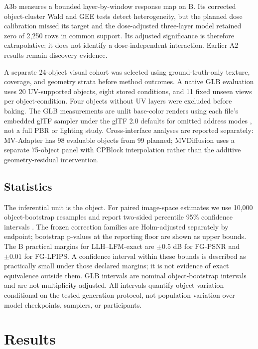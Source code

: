 \documentclass[times,twocolumn,final]{elsarticle}
\begin{document}
A3b measures a bounded layer-by-window response map on B. Its corrected object-cluster Wald and GEE tests detect heterogeneity, but the planned dose calibration missed its target and the dose-adjusted three-layer model retained zero of 2,250 rows in common support. Its adjusted significance is therefore extrapolative; it does not identify a dose-independent interaction. Earlier A2 results remain discovery evidence.

A separate 24-object visual cohort was selected using ground-truth-only texture, coverage, and geometry strata before method outcomes. A native GLB evaluation uses 20 UV-supported objects, eight stored conditions, and 11 fixed unseen views per object-condition. Four objects without UV layers were excluded before baking. The GLB measurements are unlit base-color renders using each file's embedded glTF sampler under the glTF 2.0 defaults for omitted address modes \cite{gltf2020}, not a full PBR or lighting study. Cross-interface analyses are reported separately: MV-Adapter has 98 evaluable objects from 99 planned; MVDiffusion uses a separate 75-object panel with CPBlock interpolation rather than the additive geometry-residual intervention.

\subsection{Statistics}

The inferential unit is the object. For paired image-space estimates we use 10,000 object-bootstrap resamples and report two-sided percentile 95\% confidence intervals \cite{efron1993bootstrap}. The frozen correction families are Holm-adjusted separately by endpoint; bootstrap p-values at the reporting floor are shown as upper bounds. The B practical margins for LLH--LFM-exact are $\pm0.5$ dB for FG-PSNR and $\pm0.01$ for FG-LPIPS. A confidence interval within these bounds is described as practically small under those declared margins; it is not evidence of exact equivalence outside them. GLB intervals are nominal object-bootstrap intervals and are not multiplicity-adjusted. All intervals quantify object variation conditional on the tested generation protocol, not population variation over model checkpoints, samplers, or participants.

\section{Results}
\label{sec:results}
\end{document}
